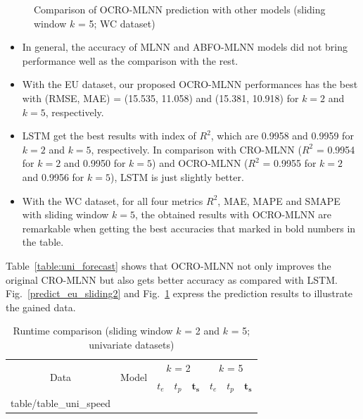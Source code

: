 \documentclass[11pt,twoside]{article}
\makeatletter
\newcommand\primitiveinput[1]
		{\@@input #1 }
\makeatother
\begin{document}
\begin{multicols}{2}
\begin{figure}[!ht]
\begin{minipage}[b]{0.33\linewidth}
  \end{minipage} 
  \caption{Comparison of OCRO-MLNN prediction with other models (sliding window $k$ = 5; WC dataset)} 
  \label{predict_wc_sliding5} 
\end{figure}



\begin{itemize}
	\item In general, the accuracy of MLNN and ABFO-MLNN models did not bring performance well as the comparison with the rest. 
	\item With the EU dataset, our proposed OCRO-MLNN performances has the best with (RMSE, MAE) = (15.535, 11.058) and (15.381, 10.918) for $k = 2$ and $k = 5$, respectively. 	
	\item LSTM get the best results with index of $R^{2}$, which are 0.9958 and 0.9959 for $k = 2$ and $k = 5$, respectively. In comparison with CRO-MLNN ($R^{2}$ = 0.9954 for $k = 2$ and 0.9950 for $k = 5$) and OCRO-MLNN ($R^2$ = 0.9955 for $k = 2$ and 0.9956 for $k = 5$), LSTM is just slightly better. 
	\item With the WC dataset, for all four metrics $R^2$, MAE, MAPE and SMAPE with sliding window $k = 5$, the obtained results with OCRO-MLNN are remarkable when getting the best accuracies that marked in bold numbers in the table. 
\end{itemize}


Table~\ref{table:uni_forecast} shows that OCRO-MLNN not only improves the original CRO-MLNN but also gets better accuracy as compared with LSTM. Fig.~\ref{predict_eu_sliding2} and Fig.~\ref{predict_wc_sliding5} express the prediction results to illustrate the gained data. 



\begin{table}[!t]
	\caption{Runtime comparison (sliding window $k$ = 2 and $k$ = 5; univariate datasets)}
	\label{table:uni_speed}
	\centering
	\begin{adjustbox}{width=0.5\textwidth, angle=270}
	\begin{sideways}
		\begin{tabular}{| c | c | c | c | c | c | c | c |}%
			\hline
			\multirow{2}{*}{Data} & \multirow{2}{*}{Model} & \multicolumn{3}{c|}{$k$ = 2} & \multicolumn{3}{c|}{ $k$ = 5 } \\ \cline{3-8}
   				& & $t_e$ & $t_p$ & $\boldsymbol{t_s}$ & $t_e$ & $t_p$ & $\boldsymbol{t_s}$  \\ [0.5ex] \hline
			\primitiveinput{table/table_uni_speed}
			\hline
		\end{tabular}
	\end{sideways}
	\end{adjustbox}
\end{table}


\end{multicols}
\end{document}
